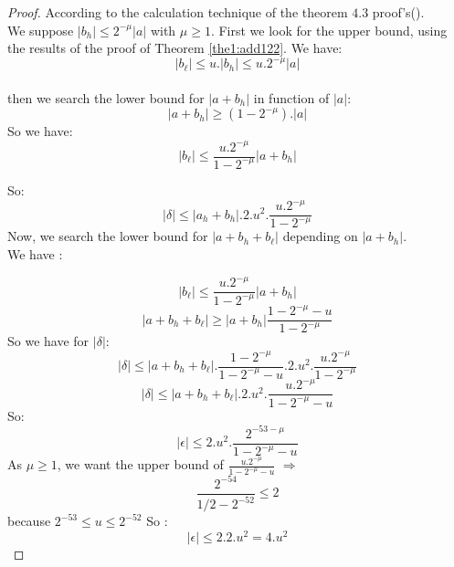 \begin{proof} \color{-yellow}
According to the calculation technique of the theorem $4.3$ proof's(\cite{lauter2005basic}).\\
We suppose $\lvert b_h \rvert \le 2^{-\mu} \lvert a \rvert$ with $\mu \ge 1$.
First we look for the upper bound, using the results of the proof of Theorem \ref{the1:add122}. We have:\\
$$\lvert b_{\ell} \rvert \le u.\lvert b_h \rvert \le u.2^{ - \mu}\lvert a \rvert $$\\
then we search the lower bound for $\lvert a+b_h \rvert$ in function of $\lvert a \rvert$:\\
$$\lvert a + b_h \rvert \ge (1-2^{ -\mu}).\lvert a\rvert$$
So we have:
$$\lvert b_{\ell}  \rvert \le \frac{u.2^{ - \mu}}{1- 2^{-\mu}}\lvert a + b_h\rvert$$

So:
$$ \lvert \delta \rvert \le \lvert a_h + b_h \rvert .2.u^2 .\frac{u.2^{- \mu}}{1 - 2^{-\mu}} $$
Now, we search the lower bound for $\lvert a + b_h +b_{\ell} \rvert$ depending on $\lvert a + b_h \rvert$.\\
We have :

$$\lvert b_{\ell}  \rvert \le \frac{u.2^{ - \mu}}{1- 2^{-\mu}}\lvert a + b_h\rvert$$
$$\lvert a + b_h +b_{\ell} \rvert \ge  \lvert a + b_h \rvert \frac{1 - 2^{-\mu} -u}{1 - 2^{-\mu}}$$
So we have for $\lvert \delta \rvert $:
$$ \lvert \delta \rvert \le \lvert a + b_h + b_{\ell} \rvert. \frac{1 - 2^{-\mu}}{1 - 2^{-\mu} -u} .2.u^2 .\frac{u.2^{ - \mu}}{1 - 2^{-\mu}} $$
$$ \lvert \delta \rvert \le \lvert a + b_h + b_{\ell} \rvert.  2.u^2.\frac{u.2^{ - \mu}}{1 - 2^{-\mu} - u} $$
So:
$$\lvert \epsilon \rvert \le  2.u^2 .\frac{2^{-53 - \mu}}{1 - 2^{-\mu} - u}$$
As $\mu \ge 1$, we want the upper bound of $\frac{u.2^{ - \mu}}{1 - 2^{-\mu} - u}$ $\Rightarrow$
$$\frac{2^{-54}}{1/2 -2^{-52}} \le 2$$
because $ 2^{-53}\le u \le 2^{-52}$
So :
$$\lvert \epsilon \rvert \le 2.2.u^2=4.u^2$$
\end{proof}

